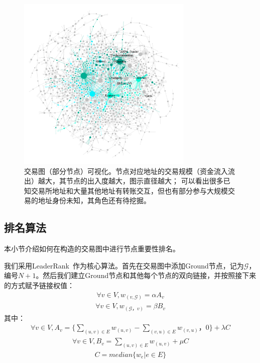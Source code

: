 \begin{figure}[!htbp]
	\centering
	\includegraphics[width=0.75\textwidth]{figs/wgc1.png}
  \caption{交易图（部分节点）可视化。\small{节点对应地址的交易规模（资金流入流出）越大，其节点的出入度越大，图示直径越大；
      可以看出很多已知交易所地址和大量其他地址有转账交互，但也有部分参与大规模交易的地址身份未知，其角色还有待挖掘。}}\label{fig:wgc}
\end{figure}

\subsection{排名算法} \label{subsec:leaderrank}
本小节介绍如何在构造的交易图中进行节点重要性排名。

我们采用LeaderRank~\cite{Chen2013}\cite{Li2014}作为核心算法。首先在交易图中添加Ground节点，记为$\mathcal{G}$，编号$N+1$。然后我们建立Ground节点和其他每个节点的双向链接，并按照接下来的方式赋予链接权值：
\begin{align}\label{formula:weight1}
	\forall v \in V, w_{(v, \mathcal{G})} = \alpha A_v
\end{align}
\begin{align}\label{formula:weight2}
\forall v \in V,  w_{(\mathcal{G}， v)} = \beta B_v
\end{align}
其中：
\begin{align}
	\forall v \in V, A_v = \{ \sum_{(u,v)\in E} w_{(u,v)} - \sum_{(v,u) \in E} w_{(v, u)}， 0 \} + \lambda C
\end{align}
\begin{align} \label{formula:b}
\forall v \in V,  B_v =  \sum_{(u,v) \in E} w_{(u,v)} + \mu C
\end{align}
\begin{align}
	C = median\{w_e| e \in E\}
\end{align}


